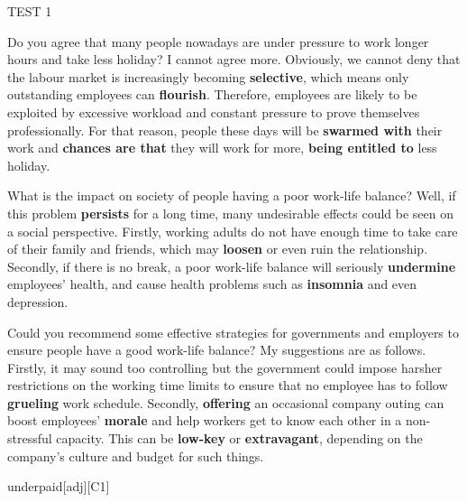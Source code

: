 \begin{glossarymc}[Cambridge 13]
\begin{test}{TEST 1}
    \begin{qa}{Do you agree that many people nowadays are under pressure to work longer hours and take less holiday?}
    I cannot agree more. Obviously, we cannot deny that the labour market is increasingly becoming \textbf{selective}, which means only outstanding employees can \textbf{flourish}. Therefore, employees are likely to be exploited by excessive workload and constant pressure to prove themselves professionally. For that reason, people these days will be \textbf{swarmed with} their work and \textbf{chances are that} they will work for more, \textbf{being entitled to} less holiday.
    \end{qa}

    \begin{qa}{What is the impact on society of people having a poor work-life balance?}
    Well, if this problem \textbf{persists} for a long time, many undesirable effects could be seen on a social perspective. Firstly, working adults do not have enough time to take care of their family and friends, which may \textbf{loosen} or even ruin the relationship. Secondly, if there is no break, a poor work-life balance will seriously \textbf{undermine} employees’ health, and cause health problems such as \textbf{insomnia} and even depression.
    \end{qa}

    \begin{qa}{Could you recommend some effective strategies for governments and employers to ensure people have a good work-life balance?}
    My suggestions are as follows. Firstly, it may sound too controlling but the government could impose harsher restrictions on the working time limits to ensure that no employee has to follow \textbf{grueling} work schedule. Secondly, \textbf{offering} an occasional company outing can boost employees’ \textbf{morale} and help workers get to know each other in a non-stressful capacity. This can be \textbf{low-key} or \textbf{extravagant}, depending on the company’s culture and budget for such things.
    \end{qa}

        \begin{VocabExplain}[Part 3]
            \begin{ExplainCard}{underpaid}[adj][C1]
            \end{ExplainCard}


\end{VocabExplain}
\end{test}
\end{glossarymc}

